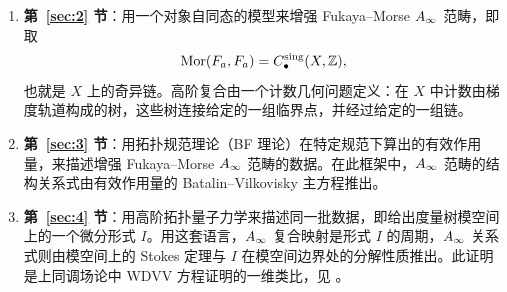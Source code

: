 \begin{enumerate}
  \item[(A)] \textbf{第~\ref{sec:2} 节}：用一个对象自同态的模型来增强 Fukaya--Morse $A_\infty$ 范畴，即取
  \begin{equation*}
    \operatorname{Mor}(F_a,F_a)=C^{\mathrm{sing}}_\bullet(X,\mathbb Z),
  \end{equation*}
  也就是 $X$ 上的奇异链。高阶复合由一个计数几何问题定义：在 $X$ 中计数由梯度轨道构成的树，这些树连接给定的一组临界点，并经过给定的一组链。
  \item[(B)] \textbf{第~\ref{sec:3} 节}：用拓扑规范理论（BF 理论）在特定规范下算出的有效作用量，来描述增强 Fukaya--Morse $A_\infty$ 范畴的数据。在此框架中，$A_\infty$ 范畴的结构关系式由有效作用量的 Batalin--Vilkovisky 主方程推出。
  \item[(C)] \textbf{第~\ref{sec:4} 节}：用高阶拓扑量子力学来描述同一批数据，即给出度量树模空间上的一个微分形式 $I$。用这套语言，$A_\infty$ 复合映射是形式 $I$ 的周期，$A_\infty$ 关系式则由模空间上的 Stokes 定理与 $I$ 在模空间边界处的分解性质推出。此证明是上同调场论中 WDVV 方程证明的一维类比，见 \cite{kontsevichmanin}。
\end{enumerate}


\endinput
